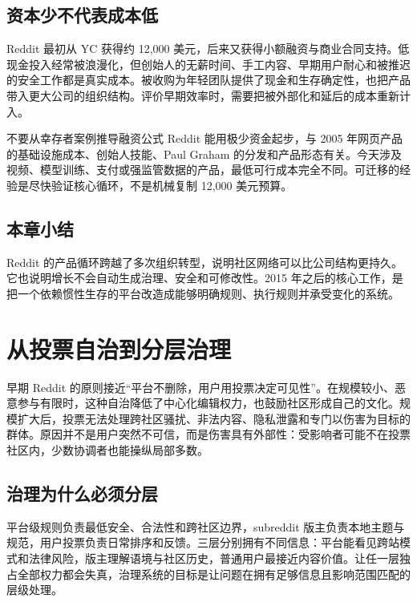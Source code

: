 \documentclass[a4paper]{article}
\begin{document}
\subsection{资本少不代表成本低}

Reddit 最初从 YC 获得约 12,000 美元，后来又获得小额融资与商业合同支持。低现金投入经常被浪漫化，但创始人的无薪时间、手工内容、早期用户耐心和被推迟的安全工作都是真实成本。被收购为年轻团队提供了现金和生存确定性，也把产品带入更大公司的组织结构。评价早期效率时，需要把被外部化和延后的成本重新计入。

\begin{warningbox}{不要从幸存者案例推导融资公式}
Reddit 能用极少资金起步，与 2005 年网页产品的基础设施成本、创始人技能、Paul Graham 的分发和产品形态有关。今天涉及视频、模型训练、支付或强监管数据的产品，最低可行成本完全不同。可迁移的经验是尽快验证核心循环，不是机械复制 12,000 美元预算。
\end{warningbox}

\subsection{本章小结}

Reddit 的产品循环跨越了多次组织转型，说明社区网络可以比公司结构更持久。它也说明增长不会自动生成治理、安全和可修改性。2015 年之后的核心工作，是把一个依赖惯性生存的平台改造成能够明确规则、执行规则并承受变化的系统。

\section{从投票自治到分层治理}

早期 Reddit 的原则接近“平台不删除，用户用投票决定可见性”。在规模较小、恶意参与有限时，这种自治降低了中心化编辑权力，也鼓励社区形成自己的文化。规模扩大后，投票无法处理跨社区骚扰、非法内容、隐私泄露和专门以伤害为目标的群体。原因并不是用户突然不可信，而是伤害具有外部性：受影响者可能不在投票社区内，少数协调者也能操纵局部多数。

\subsection{治理为什么必须分层}

平台级规则负责最低安全、合法性和跨社区边界，subreddit 版主负责本地主题与规范，用户投票负责日常排序和反馈。三层分别拥有不同信息：平台能看见跨站模式和法律风险，版主理解语境与社区历史，普通用户最接近内容价值。让任一层独占全部权力都会失真，治理系统的目标是让问题在拥有足够信息且影响范围匹配的层级处理。
\end{document}
